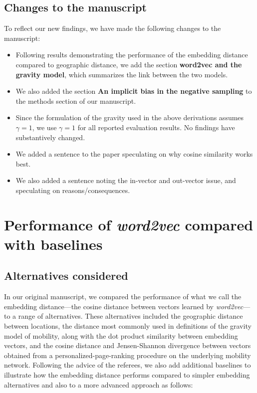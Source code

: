 \documentclass[12pt,draft,a4paper]{article}
\begin{document}
\subsection{Changes to the manuscript}
To reflect our new findings, we have made the following changes to the manuscript:
\begin{itemize}
	\itemsep0em
	\item Following results demonstrating the performance of the embedding distance compared to geographic distance, we add the section \textbf{word2vec and the gravity model}, which summarizes the link between the two models.
	\item We also added the section \textbf{An implicit bias in the negative sampling} to the methods section of our manuscript.
	\item Since the formulation of the gravity used in the above derivations assumes $\gamma = 1$, we use $\gamma = 1$ for all reported evaluation results. No findings have substantively changed.
	\item We added a sentence to the paper speculating on why cosine similarity works best.
	\item We also added a sentence noting the in-vector and out-vector issue, and speculating on reasons/consequences.
\end{itemize}


%
%
\section{Performance of \textit{word2vec} compared with baselines}
\subsection{Alternatives considered}
In our original manuscript, we compared the performance of what we call the embedding distance---the cosine distance between vectors learned by \textit{word2vec}---to a range of alternatives.
These alternatives included the geographic distance between locations, the distance most commonly used in definitions of the gravity model of mobility, along with the dot product similarity between embedding vectors, and the cosine distance and Jensen-Shannon divergence between vectors obtained from a personalized-page-ranking procedure on the underlying mobility network. Following the advice of the referees, we also add additional baselines to illustrate how the embedding distance performs compared to simpler embedding alternatives and also to a more advanced approach as follows:
\end{document}
